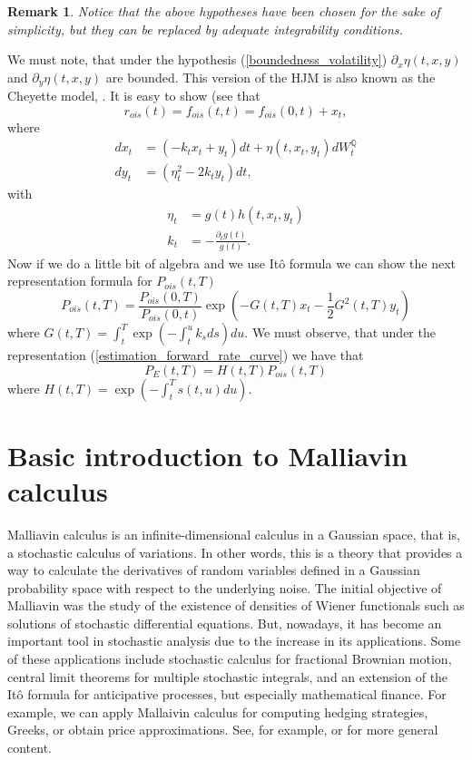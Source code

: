 \documentclass[a4paper,10pt]{article}
\newtheorem{remark}[theorem]{Remark}
\newcommand{\1}{\mathbf{1}}
\begin{document}
\begin{remark}
Notice that the above hypotheses have been chosen for the sake of simplicity, but they can be replaced by adequate integrability conditions.
\end{remark}
We must note, that under the hypothesis (\ref{boundedness_volatility}) $\partial_x \eta(t,x,y)$ and $\partial_y \eta(t,x,y)$ are bounded. This version of the HJM is also known as the Cheyette model, \cite{Cheyette}. It is easy to show (see \cite{Andreasen01} that
\begin{equation}
r_{ois}(t)=f_{ois}(t,t)= f_{ois}(0,t) + x_t,
\end{equation}  
where
\begin{align}\label{short_rate_cheyette}
dx_t &= (-k_t x_t + y_t)dt + \eta(t,x_t,y_t) dW_t^{\mathbb{Q}} \nonumber \\
dy_t &= (\eta^{2}_t - 2 k_t y_t) dt ,
\end{align} 
with 
\begin{align*}
\eta_t &= g(t)h(t,x_t,y_t)  \nonumber \\
k_t &= - \frac{\partial_t g(t)}{g(t)}.
\end{align*}
Now if we do a little bit of algebra and we use Itô formula we can show the next representation formula for $P_{ois}(t,T)$
\begin{equation}\label{bond_ois}
P_{ois}(t,T) = \frac{P_{ois}(0,T)}{P_{ois}(0,t)} \exp\left(-G(t,T)x_t - \frac{1}{2} G^{2}(t,T)y_t \right)
\end{equation}
where $G(t,T) = \int_{t}^{T} \exp\left(-\int_{t}^{u} k_s ds \right) du$. We must observe, that under the representation (\ref{estimation_forward_rate_curve}) we have that
\begin{equation}\label{bond_forward}
P_{E}(t,T)=H(t,T)P_{ois}(t,T)
\end{equation}
where $H(t,T)=\exp\left(-\int_{t}^{T}s(t,u) du \right)$.

\section{Basic introduction to Malliavin calculus}\label{sec:Malliavin}
Malliavin calculus is an infinite-dimensional calculus in a Gaussian space, that is, a stochastic calculus of variations. In other words, this is a theory that provides a way to calculate the derivatives of random variables defined in a Gaussian probability space with respect to the underlying noise. The initial objective of Malliavin was the study of the existence of densities of Wiener functionals such as solutions of stochastic differential equations. But, nowadays, it has become an important tool in stochastic analysis due to the increase in its applications. Some of these applications include stochastic calculus for fractional Brownian motion, central limit theorems for multiple stochastic integrals, and an extension of the Itô formula for anticipative processes, but especially mathematical finance. For example, we can apply Mallaivin calculus for computing hedging strategies, Greeks, or obtain price approximations. See, for example, \cite{AlosLorite} or \cite{Nualart} for more general content.\\
\end{document}

